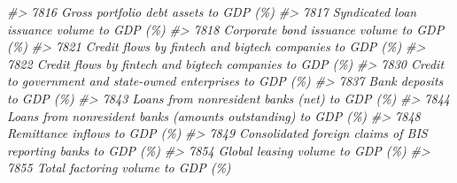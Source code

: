 \documentclass[
]{bxjsbook}
\newenvironment{Shaded}{\begin{snugshade}}{\end{snugshade}}
\newcommand{\CommentTok}[1]{\textcolor[rgb]{0.56,0.35,0.01}{\textit{#1}}}
\theoremstyle{definition}
\theoremstyle{definition}
\theoremstyle{definition}
\theoremstyle{definition}
\theoremstyle{remark}
\begin{document}
\begin{Shaded}
\begin{Highlighting}[]
\CommentTok{\#\textgreater{} 7816                                                                                                                                     Gross portfolio debt assets to GDP (\%)}
\CommentTok{\#\textgreater{} 7817                                                                                                                                 Syndicated loan issuance volume to GDP (\%)}
\CommentTok{\#\textgreater{} 7818                                                                                                                                  Corporate bond issuance volume to GDP (\%)}
\CommentTok{\#\textgreater{} 7821                                                                                                                   Credit flows by fintech and bigtech companies to GDP (\%)}
\CommentTok{\#\textgreater{} 7822                                                                                                                   Credit flows by fintech and bigtech companies to GDP (\%)}
\CommentTok{\#\textgreater{} 7830                                                                                                                Credit to government and state{-}owned enterprises to GDP (\%)}
\CommentTok{\#\textgreater{} 7837                                                                                                                                                   Bank deposits to GDP (\%)}
\CommentTok{\#\textgreater{} 7843                                                                                                                              Loans from nonresident banks (net) to GDP (\%)}
\CommentTok{\#\textgreater{} 7844                                                                                                              Loans from nonresident banks (amounts outstanding) to GDP (\%)}
\CommentTok{\#\textgreater{} 7848                                                                                                                                              Remittance inflows to GDP (\%)}
\CommentTok{\#\textgreater{} 7849                                                                                                              Consolidated foreign claims of BIS reporting banks to GDP (\%)}
\CommentTok{\#\textgreater{} 7854                                                                                                                                           Global leasing volume to GDP (\%)}
\CommentTok{\#\textgreater{} 7855                                                                                                                                          Total factoring volume to GDP (\%)}

\end{Highlighting}
\end{Shaded}
\end{document}
